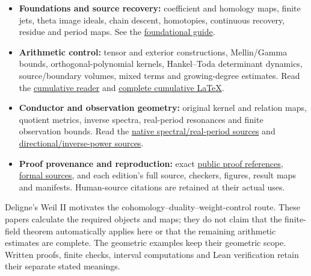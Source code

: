 \documentclass[
]{article}
\providecommand{\tightlist}{%
  \setlength{\itemsep}{0pt}\setlength{\parskip}{0pt}}
\begin{document}
\begin{itemize}
\tightlist
\item
  \textbf{Foundations and source recovery:} coefficient and homology
  maps, finite jets, theta image ideals, chain descent, homotopies,
  continuous recovery, residue and period maps. See the
  \href{https://github.com/KokunoYumeto/zeta-function-research-reader/blob/main/RESEARCH_PROGRAMMES.md}{foundational
  guide}.
\item
  \textbf{Arithmetic control:} tensor and exterior constructions,
  Mellin/Gamma bounds, orthogonal-polynomial kernels, Hankel--Toda
  determinant dynamics, source/boundary volumes, mixed terms and
  growing-degree estimates. Read the
  \href{https://zenodo.org/records/22865640/files/92-splitzero-cited-receiver-reader.pdf?download=1}{cumulative
  reader} and
  \href{https://github.com/KokunoYumeto/zeta-function-research-reader/blob/666ee448d5ecb0bf8a4888f3a2aceaaa5c74d6d8/workbenches/splitzero-tandem/continuations/20260921-historical-proof-citations/README.md}{complete
  cumulative LaTeX}.
\item
  \textbf{Conductor and observation geometry:} original kernel and
  relation maps, quotient metrics, inverse spectra, real-period
  resonances and finite observation bounds. Read the
  \href{https://github.com/KokunoYumeto/zeta-function-research-reader/blob/0fd693c844aad9117e30ec447c59864a28af10f3/workbenches/splitzero-tandem/continuations/20260921-native-spectral-real-pair/README.md}{native
  spectral/real-period sources} and
  \href{https://github.com/KokunoYumeto/zeta-function-research-reader/blob/689a8f87e9c12b7a99b01b3123438c6751ee608f/workbenches/splitzero-tandem/continuations/20260921-directional-inverse-power/README.md}{directional/inverse-power
  sources}.
\item
  \textbf{Proof provenance and reproduction:} exact
  \href{https://github.com/KokunoYumeto/zeta-function-research-reader/blob/666ee448d5ecb0bf8a4888f3a2aceaaa5c74d6d8/workbenches/splitzero-tandem/continuations/20260921-historical-proof-citations/REFERENCES.md}{public
  proof references},
  \href{https://github.com/KokunoYumeto/zeta-function-research-reader/tree/main/formal/splitzero}{formal
  sources}, and each edition's full source, checkers, figures, result
  maps and manifests. Human-source citations are retained at their
  actual uses.
\end{itemize}

Deligne's Weil II motivates the cohomology--duality--weight-control
route. These papers calculate the required objects and maps; they do not
claim that the finite-field theorem automatically applies here or that
the remaining arithmetic estimates are complete. The geometric examples
keep their geometric scope. Written proofs, finite checks, interval
computations and Lean verification retain their separate stated
meanings.
\end{document}
